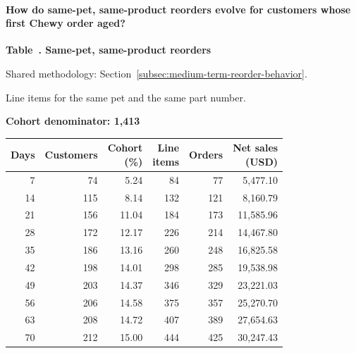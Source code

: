 \paragraph{How do same-pet, same-product reorders evolve for customers whose first Chewy order aged?}

\label{tab:financial-opportunity-new-chewy-follow-up}
\par\smallskip\noindent\parbox[t][2\baselineskip][t]{\linewidth}{\raggedright\textbf{Table~\thetable. Same-pet, same-product reorders}}
\par\raggedright\footnotesize Shared methodology: Section~\ref{subsec:medium-term-reorder-behavior}.
\par\noindent\parbox[t][2\baselineskip][t]{\linewidth}{\raggedright Line items for the same pet and the same part number.}
\par\noindent\textbf{Cohort denominator: 1,413}
\par\centering\footnotesize
\setlength{\tabcolsep}{2pt}
\begin{tabular}{rrrrrr}\toprule
Days & Customers & \shortstack{Cohort\\(\%)} & \shortstack{Line\\items} & Orders & \shortstack{Net sales\\(USD)} \\ \midrule
7 & 74 & 5.24 & 84 & 77 & 5,477.10 \\
14 & 115 & 8.14 & 132 & 121 & 8,160.79 \\
21 & 156 & 11.04 & 184 & 173 & 11,585.96 \\
28 & 172 & 12.17 & 226 & 214 & 14,467.80 \\
35 & 186 & 13.16 & 260 & 248 & 16,825.58 \\
42 & 198 & 14.01 & 298 & 285 & 19,538.98 \\
49 & 203 & 14.37 & 346 & 329 & 23,221.03 \\
56 & 206 & 14.58 & 375 & 357 & 25,270.70 \\
63 & 208 & 14.72 & 407 & 389 & 27,654.63 \\
70 & 212 & 15.00 & 444 & 425 & 30,247.43 \\
\bottomrule\end{tabular}\par

